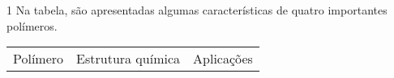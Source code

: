 \documentclass[\mainfilename]{subfiles}
\begin{document}
\begin{questionBox}1{ %
    Na tabela, são apresentadas algumas características de quatro importantes polímeros.
    } %
    \def\X{\textcolor{Graph41}X}
    \def\Y{\textcolor{Graph42}Y}
    \def\Z{\textcolor{Graph43}Z}
    \def\W{\textcolor{Graph44}W}

    \begin{center}
        \vspace{1ex}
        \setlength\tabcolsep{3mm} %
        \begin{tabular}{c@{}c m{10em}}
            \toprule
            
                \multicolumn{1}{c}{Polímero}
                & \multicolumn{1}{c}{Estrutura química}
                & \multicolumn{1}{c}{Aplicações}
            

\end{tabular}
\end{center}
\end{questionBox}
\end{document}
